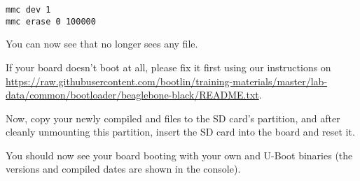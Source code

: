 \begin{verbatim}
mmc dev 1
mmc erase 0 100000
\end{verbatim}

You can now see that  no longer sees any file.

If your board doesn't boot at all, please fix it first using our instructions
on
\url{https://raw.githubusercontent.com/bootlin/training-materials/master/lab-data/common/bootloader/beaglebone-black/README.txt}.

Now, copy your newly compiled  and  files to
the SD card's  partition, and after cleanly unmounting this
partition, insert the SD card into the board and reset it.

You should now see your board booting with your own  and U-Boot
binaries (the versions and compiled dates are shown in the console). 
